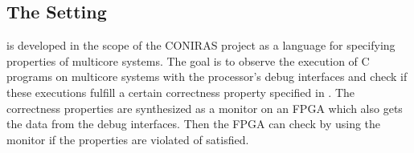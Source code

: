 



\subsection{The Setting}

\tessla is developed in the scope of the CONIRAS project as a language for specifying properties of multicore systems. The goal is to observe the execution of C programs on multicore systems with the processor's debug interfaces and check if these executions fulfill a certain correctness property specified in \tessla. The correctness properties are synthesized as a monitor on an FPGA which also gets the data from the debug interfaces. Then the FPGA can check by using the monitor if the properties are violated of satisfied.

